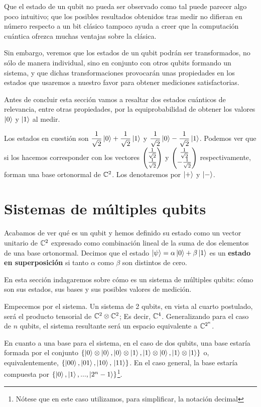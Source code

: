 Que el estado de un qubit no pueda ser observado como tal puede parecer algo poco intuitivo; que los posibles resultados obtenidos tras medir no difieran en número respecto a un bit clásico tampoco ayuda a creer que la computación cuántica ofrezca muchas ventajas sobre la clásica.

Sin embargo, veremos que los estados de un qubit podrán ser transformados, no sólo de manera individual, sino en conjunto con otros qubits formando un sistema, y que dichas transformaciones provocarán unas propiedades en los estados que usaremos a nuestro favor para obtener mediciones satisfactorias.

Antes de concluir esta sección vamos a resaltar dos estados cuánticos de relevancia, entre otras propiedades, por la equiprobabilidad de obtener los valores $\left|0\right\rangle$ y $\left|1\right\rangle$ al medir.

Los estados en cuestión son $\dfrac{1}{\sqrt{2}}\left|0\right\rangle + \dfrac{1}{\sqrt{2}}\left|1\right\rangle$ y $\dfrac{1}{\sqrt{2}}\left|0\right\rangle - \dfrac{1}{\sqrt{2}}\left|1\right\rangle$. Podemos ver que si los hacemos corresponder con los vectores $\begin{pmatrix} \frac{1}{\sqrt{2}} \\ \frac{1}{\sqrt{2}} \end{pmatrix}$ y $\begin{pmatrix} \frac{1}{\sqrt{2}} \\ -\frac{1}{\sqrt{2}} \end{pmatrix}$ respectivamente, forman una base ortonormal de $\mathbb{C}^2$. Los denotaremos por $\left|+\right\rangle$ y $\left|-\right\rangle$.

\section{Sistemas de múltiples qubits}

Acabamos de ver qué es un qubit y hemos definido su estado como un vector unitario de $\mathbb{C}^2$ expresado como combinación lineal de la suma de dos elementos de una base ortonormal. Decimos que el estado $\left|\psi\right\rangle=\alpha\left|0\right\rangle+\beta\left|1\right\rangle$ es un \textbf{estado en superposición} si tanto $\alpha$ como $\beta$ son distintos de cero.

En esta sección indagaremos sobre cómo es un sistema de múltiples qubits: cómo son sus estados, sus bases y sus posibles valores de medición.

Empecemos por el sistema. Un sistema de 2 qubits, en vista al cuarto postulado, será el producto tensorial de $\mathbb{C}^2\otimes\mathbb{C}^2$; Es decir, $\mathbb{C}^4$. Generalizando para el caso de $n$ qubits, el sistema resultante será un espacio equivalente a $\mathbb{C}^{2^n}$.

En cuanto a una base para el sistema, en el caso de dos qubits, una base estaría formada por el conjunto $\{\left|0\right\rangle\otimes\left|0\right\rangle,\left|0\right\rangle\otimes\left|1\right\rangle,\left|1\right\rangle\otimes\left|0\right\rangle,\left|1\right\rangle\otimes\left|1\right\rangle\}$ o, equivalentemente, $\{\left|00\right\rangle,\left|01\right\rangle,\left|10\right\rangle,\\ \left|11\right\rangle\}$. En el caso general, la base estaría compuesta por $\{\left|0\right\rangle,\left|1\right\rangle,...,\left|2^n-1\right\rangle\}$\footnote{Nótese que en este caso utilizamos, para simplificar, la notación decimal}.

